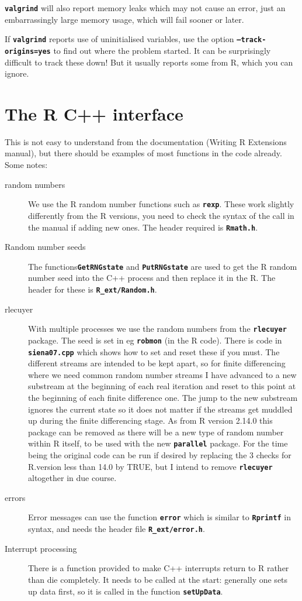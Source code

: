 \documentclass[12pt, a4paper]{article}
\renewcommand{\=}{\,=\,}
\newcommand{\+}{\,+\,}
\newcommand{\sfn}[1]{\textbf{\texttt{#1}}}
\begin{document}
\sfn{valgrind} will also report memory leaks which may not cause an error, just
an embarrassingly large memory usage, which will fail sooner or later.

If \sfn{valgrind} reports use of uninitialised variables, use the option
\sfn{--track-origins=yes} to find out where the problem started. It can be
surprisingly difficult to track these down! But it usually reports some from R,
which you can ignore.
\section{The R C++ interface}
This is not easy to understand from the documentation (Writing R Extensions
manual), but there should be examples of most functions in the code
already. Some notes:
\begin{description}
\item[random numbers]
We use the R random number functions such as \sfn{rexp}. These work slightly
differently from the R versions, you need to check the syntax of the call in
the manual if adding new ones. The header required is \sfn{Rmath.h}.
\item[Random number seeds] The functions\sfn{GetRNGstate} and
\sfn{PutRNGstate}  are used to get the R random number seed into the C++
process and then replace it in the R. The header for these is
\sfn{R\_ext/Random.h}.
\item[rlecuyer]
With multiple processes we use the random numbers from the \sfn{rlecuyer}
package. The seed is set in eg \sfn{robmon} (in the R code). There is code in
\sfn{siena07.cpp} which shows how to set and reset these if you must. The
different streams are intended to be kept apart, so for finite differencing
where we need common random number streams I have advanced to a new substream at
the beginning of each real iteration and reset to this point at the beginning of
each finite difference one. The jump to the new substream ignores the current
state so it does not matter if the streams get muddled up during the finite
differencing stage. As from R version 2.14.0 this package can be removed as
there will be a new type of random number within R itself, to be used with the
new \sfn{parallel} package. For the time being the original code can be run if
desired by replacing the 3 checks for R.version less than 14.0 by TRUE, but I
intend to remove \sfn{rlecuyer} altogether in due course.
\item[errors]
Error messages can use the function \sfn{error} which is similar to
\sfn{Rprintf} in syntax, and needs the header file \sfn{R\_ext/error.h}.
\item[Interrupt processing] There is a function provided to make C++ interrupts
  return to R rather than die completely. It needs to be called at the start:
  generally one sets up data first, so it is called in the function
  \sfn{setUpData}.
\end{description}
\end{document}
